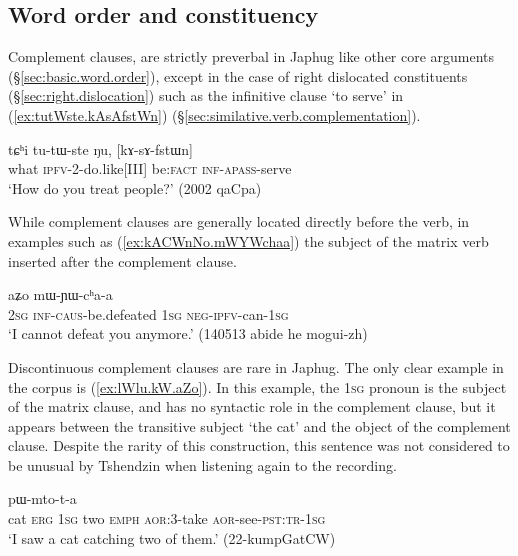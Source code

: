 \subsection{Word order and constituency}  \label{sec:complement.word.order}
Complement clauses, are strictly preverbal in Japhug like other core arguments (§\ref{sec:basic.word.order}), except in the case of right dislocated constituents (§\ref{sec:right.dislocation}) such as the infinitive clause  `to serve' in (\ref{ex:tutWste.kAsAfstWn}) (§\ref{sec:similative.verb.complementation}).

\begin{exe}
\ex \label{ex:tutWste.kAsAfstWn}
\gll tɕʰi tu-tɯ-ste ŋu, [kɤ-sɤ-fstɯn]\\
what \textsc{ipfv}-2-do.like[III] be:\textsc{fact} \textsc{inf}-\textsc{apass}-serve \\
\glt `How do you treat people?' (2002 qaCpa)
\end{exe}

While complement clauses are generally located directly before the verb, in examples such as (\ref{ex:kACWnNo.mWYWchaa}) the subject of the matrix verb inserted after the complement clause.

\begin{exe}
\ex \label{ex:kACWnNo.mWYWchaa}
 aʑo mɯ-ɲɯ-cʰa-a \\
\textsc{2sg} \textsc{inf}-\textsc{caus}-be.defeated \textsc{1sg} \textsc{neg}-\textsc{ipfv}-can-\textsc{1sg} \\
\glt `I cannot defeat you anymore.' (140513 abide he mogui-zh)
\end{exe}

Discontinuous complement clauses are rare in Japhug. The only clear example in the corpus is (\ref{ex:lWlu.kW.aZo}). In this example, the \textsc{1sg} pronoun  is the subject of the matrix clause, and has no syntactic role in the complement clause, but it appears between the transitive subject  `the cat' and the object  of the complement clause. Despite the rarity of this construction, this sentence was not considered to be unusual by Tshendzin when listening again to the recording.
 
 \begin{exe}
\ex \label{ex:lWlu.kW.aZo}
 pɯ-mto-t-a \\
cat \textsc{erg} \textsc{1sg} two \textsc{emph} \textsc{aor}:3\flobv{}-take \textsc{aor}-see-\textsc{pst}:\textsc{tr}-\textsc{1sg} \\
\glt `I saw a cat catching two of them.' (22-kumpGatCW)
\end{exe}

